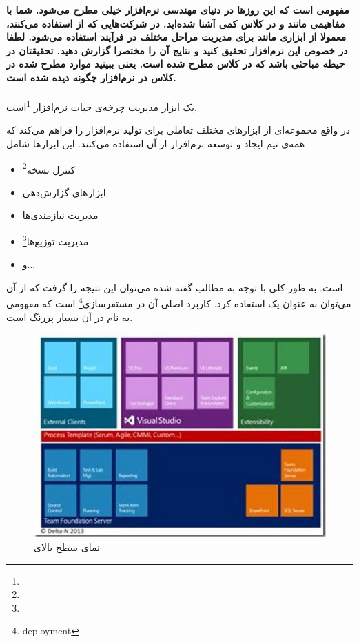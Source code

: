 
\textbf{ مفهومی است که این روز‌ها در دنیای مهندسی نرم‌افزار خیلی مطرح می‌شود. شما با مفاهیمی مانند  و  در کلاس کمی آشنا شده‌اید. در شرکت‌هایی که از  استفاده می‌کنند، معمولا از ابزاری مانند  برای مدیریت مراحل مختلف در فرآیند استفاده می‌شود. لطفا در خصوص این نرم‌افزار تحقیق کنید و نتایج آن را مختصرا گزارش دهید. تحقیقتان در حیطه مباحثی باشد که در کلاس مطرح شده است. یعنی ببینید موارد مطرح شده در کلاس در نرم‌افزار چگونه دیده شده است.}
\\
\\
 یک ابزار مدیریت چرخه‌ی حیات نرم‌افزار \footnote{}است. 

در واقع  مجموعه‌ای از ابزارهای مختلف تعاملی برای تولید نرم‌افزار را فراهم می‌کند که همه‌ی تیم ایجاد و توسعه نرم‌افزار از آن استفاده می‌کنند. این ابزارها شامل 
\begin{itemize}
	\item کنترل نسخه\footnote{}
	\item ابزارهای گزارش‌دهی
	\item مدیریت نیازمندی‌ها
	\item مدیریت توزیع‌ها\footnote{}
	\item و...

\end{itemize}
	است. به طور کلی با توجه به مطالب گفته شده می‌توان این نتیجه را گرفت که از آن می‌توان به عنوان یک  استفاده کرد. کاربرد اصلی آن در مستقرسازی\footnote{deployment} است که مفهومی به نام  در آن بسیار پررنگ است.
	
	\begin{figure}[!h]
		\begin{center}
			\includegraphics[scale=0.7]{./4.jpg}
		\end{center}
		\caption{نمای سطح بالای }
	\end{figure}

